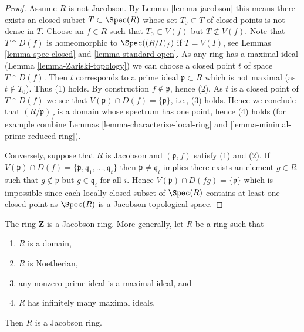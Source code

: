 \begin{proof}
Assume $R$ is not Jacobson.
By Lemma \ref{lemma-jacobson} this means there exists an
closed subset $T \subset \Spec(R)$
whose set $T_0 \subset T$ of closed points is not dense in $T$.
Choose an $f \in R$ such that $T_0 \subset V(f)$ but
$T \not \subset V(f)$. Note that $T \cap D(f)$
is homeomorphic to $\Spec((R/I)_f)$ if $T = V(I)$, see
Lemmas \ref{lemma-spec-closed} and \ref{lemma-standard-open}.
As any ring has a maximal ideal
(Lemma \ref{lemma-Zariski-topology}) we can choose a closed point $t$ of
space $T \cap D(f)$. Then $t$ corresponds to a prime ideal
$\mathfrak p \subset R$ which is not maximal (as $t \not \in T_0$).
Thus (1) holds. By construction $f \not \in \mathfrak p$, hence (2).
As $t$ is a closed point of $T \cap D(f)$ we see that
$V(\mathfrak p) \cap D(f) = \{\mathfrak p\}$, i.e., (3) holds. Hence we
conclude that $(R/\mathfrak p)_f$ is a domain whose
spectrum has one point, hence (4) holds
(for example combine Lemmas \ref{lemma-characterize-local-ring} and
\ref{lemma-minimal-prime-reduced-ring}).

\medskip\noindent
Conversely, suppose that $R$ is Jacobson and $(\mathfrak p, f)$
satisfy (1) and (2). If
$V(\mathfrak p) \cap D(f) =
\{\mathfrak p, \mathfrak q_1, \ldots, \mathfrak q_t\}$
then $\mathfrak p \not = \mathfrak q_i$
implies there exists an element $g \in R$ such that $g \not \in \mathfrak p$
but $g \in \mathfrak q_i$ for all $i$. Hence
$V(\mathfrak p) \cap D(fg) = \{\mathfrak p\}$ which
is impossible since each locally closed subset of $\Spec(R)$
contains at least one closed point as $\Spec(R)$ is
a Jacobson topological space.
\end{proof}

\begin{lemma}
\label{lemma-pid-jacobson}
The ring $\mathbf{Z}$ is a Jacobson ring.
More generally, let $R$ be a ring such that
\begin{enumerate}
\item $R$ is a domain,
\item $R$ is Noetherian,
\item any nonzero prime ideal is a maximal ideal, and
\item $R$ has infinitely many maximal ideals.
\end{enumerate}
Then $R$ is a Jacobson ring.
\end{lemma}

